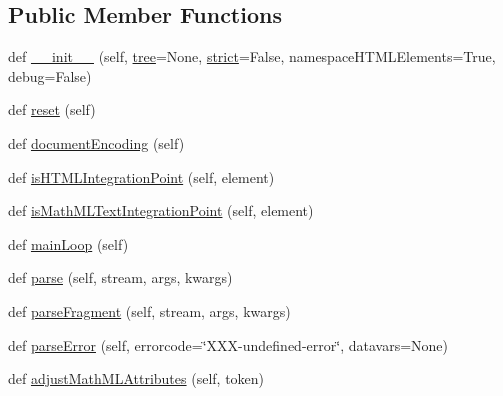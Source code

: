 \subsection*{Public Member Functions}
\begin{DoxyCompactItemize}
\item 
def \hyperlink{classpip_1_1__vendor_1_1html5lib_1_1html5parser_1_1HTMLParser_ad9b0cd5d2f6a8f940f4efc6b6124c9be}{\+\_\+\+\_\+init\+\_\+\+\_\+} (self, \hyperlink{classpip_1_1__vendor_1_1html5lib_1_1html5parser_1_1HTMLParser_a70c33f3ad382e61b13e5e8557358794f}{tree}=None, \hyperlink{classpip_1_1__vendor_1_1html5lib_1_1html5parser_1_1HTMLParser_a274f652bac6781828607ae4562072be1}{strict}=False, namespace\+H\+T\+M\+L\+Elements=True, debug=False)
\item 
def \hyperlink{classpip_1_1__vendor_1_1html5lib_1_1html5parser_1_1HTMLParser_afd57ec3d47ecc1e4a08ac4bbc842df20}{reset} (self)
\item 
def \hyperlink{classpip_1_1__vendor_1_1html5lib_1_1html5parser_1_1HTMLParser_a4be29bc594d821c4e862c0e77d7f8449}{document\+Encoding} (self)
\item 
def \hyperlink{classpip_1_1__vendor_1_1html5lib_1_1html5parser_1_1HTMLParser_a9cca5f1a0e9f2be6cf1031b51aa4021a}{is\+H\+T\+M\+L\+Integration\+Point} (self, element)
\item 
def \hyperlink{classpip_1_1__vendor_1_1html5lib_1_1html5parser_1_1HTMLParser_a742ed787b3b3651f57fb706cf2dc88e4}{is\+Math\+M\+L\+Text\+Integration\+Point} (self, element)
\item 
def \hyperlink{classpip_1_1__vendor_1_1html5lib_1_1html5parser_1_1HTMLParser_ae297e849d198615154c12cefe3cc7850}{main\+Loop} (self)
\item 
def \hyperlink{classpip_1_1__vendor_1_1html5lib_1_1html5parser_1_1HTMLParser_ae92f6d5acf6f4e6f562d69b53c935e86}{parse} (self, stream, args, kwargs)
\item 
def \hyperlink{classpip_1_1__vendor_1_1html5lib_1_1html5parser_1_1HTMLParser_ade6e4581925c9d58fd499df172fc88ce}{parse\+Fragment} (self, stream, args, kwargs)
\item 
def \hyperlink{classpip_1_1__vendor_1_1html5lib_1_1html5parser_1_1HTMLParser_a9c5fbf983ca2c56198830912ab893a7e}{parse\+Error} (self, errorcode=\char`\"{}X\+XX-\/undefined-\/error\char`\"{}, datavars=None)
\item 
def \hyperlink{classpip_1_1__vendor_1_1html5lib_1_1html5parser_1_1HTMLParser_a30e9ea73e903053a1d094b06875f2dcd}{adjust\+Math\+M\+L\+Attributes} (self, token)
\item 

\end{DoxyCompactItemize}
